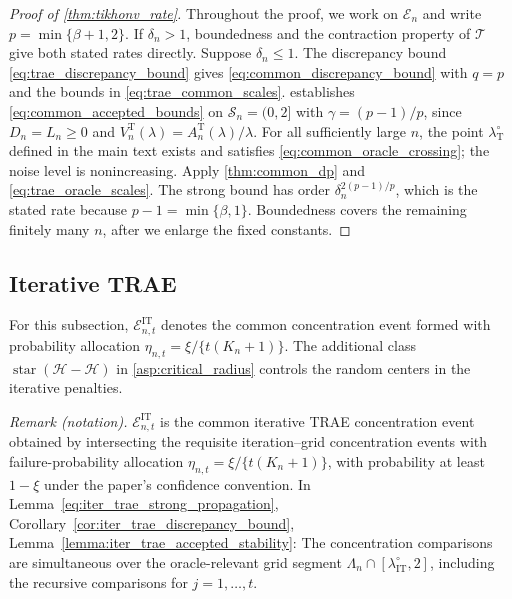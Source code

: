 \begin{proof}[Proof of \cref{thm:tikhonv_rate}]
Throughout the proof, we work on $\mathcal E_n$ and write $p=\min\{\beta+1,2\}$.
If $\delta_n>1$, boundedness and the contraction property of $\mathcal T$ give both stated rates directly. Suppose $\delta_n\leqslant1$. The discrepancy bound \eqref{eq:trae_discrepancy_bound} gives \eqref{eq:common_discrepancy_bound} with $q=p$ and the bounds in \eqref{eq:trae_common_scales}.  establishes \eqref{eq:common_accepted_bounds} on $\mathcal S_n=(0,2]$ with $\gamma=(p-1)/p$, since $D_n=L_n\geqslant0$ and $V_n^{\mathrm T}(\lambda)=A_n^{\mathrm T}(\lambda)/\lambda$. For all sufficiently large $n$, the point $\lambda_{\mathrm T}^\circ$ defined in the main text exists and satisfies \eqref{eq:common_oracle_crossing}; the noise level is nonincreasing. Apply \cref{thm:common_dp} and \eqref{eq:trae_oracle_scales}. The strong bound has order $\delta_n^{2(p-1)/p}$, which is the stated rate because $p-1=\min\{\beta,1\}$. Boundedness covers the remaining finitely many $n$, after we enlarge the fixed constants.
\end{proof}

\subsection{Iterative TRAE}

For this subsection, $\mathcal E_{n,t}^{\mathrm{IT}}$ denotes the common concentration event formed with probability allocation $\eta_{n,t}=\xi/\{t(K_n+1)\}$. The additional class $\operatorname{star}(\mathcal H-\mathcal H)$ in \cref{asp:critical_radius} controls the random centers in the iterative penalties.

\noindent\textit{Remark (notation).} $\mathcal E_{n,t}^{\mathrm{IT}}$ is the common iterative TRAE concentration event obtained by intersecting the requisite iteration--grid concentration events with failure-probability allocation $\eta_{n,t}=\xi/\{t(K_n+1)\}$, with probability at least $1-\xi$ under the paper's confidence convention. In Lemma~\ref{eq:iter_trae_strong_propagation}, Corollary~\ref{cor:iter_trae_discrepancy_bound}, Lemma~\ref{lemma:iter_trae_accepted_stability}: The concentration comparisons are simultaneous over the oracle-relevant grid segment $\Lambda_n\cap[\lambda_{\mathrm{IT}}^\circ,2]$, including the recursive comparisons for $j=1,\ldots,t$.


